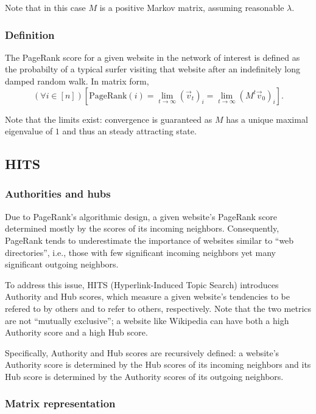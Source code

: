 \documentclass[12pt, titlepage, twoside]{amsart}
\begin{document}
Note that in this case $M$ is a positive Markov matrix, assuming reasonable $\lambda$.

\subsubsection{Definition}

The PageRank score for a given website in the network of interest is defined as the probabilty of a typical surfer
visiting that website after an indefinitely long damped random walk.
In matrix form,
\[
  (\forall i\in[n])
  \left[\mathrm{PageRank}(i) = \lim_{t\to\infty}(\vec{v}_t)_i = \lim_{t\to\infty}\left(M^t\vec{v}_0\right)_i\right].
\]

Note that the limits exist: convergence is guaranteed as $M$ has a unique maximal eigenvalue of $1$ and thus an steady
attracting state.

\subsection{HITS}

\subsubsection{Authorities and hubs}

Due to PageRank's algorithmic design, a given website's PageRank score determined mostly by the scores of its
incoming neighbors.
Consequently, PageRank tends to underestimate the importance of websites similar to ``web directories'', i.e., those
with few significant incoming neighbors yet many significant outgoing neighbors.

To address this issue, HITS (Hyperlink-Induced Topic Search) introduces Authority and Hub scores, which measure
a given website's tendencies to be refered to by others and to refer to others, respectively.
Note that the two metrics are not ``mutually exclusive''; a website like Wikipedia can have both a high Authority score
and a high Hub score.

Specifically, Authority and Hub scores are recursively defined: a website's Authority score is determined by
the Hub scores of its incoming neighbors and its Hub score is determined by the Authority scores of its outgoing
neighbors.

\subsubsection{Matrix representation}
\end{document}
